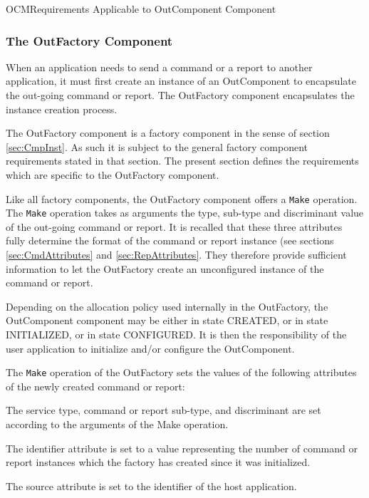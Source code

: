 \documentclass[a4paper,10pt]{article}
\newenvironment{fw_itemize}						%
{\begin{itemize}
  \setlength{\itemsep}{1mm}
  \setlength{\parskip}{0pt}
  \setlength{\parsep}{0pt}}
{\end{itemize}}
\newenvironment{cr_req}[2]
{%
\begin{longtable}{|l|p{9.8cm}|}
\caption{#2} \\
\hline
\rowcolor{light-gray}
\textbf{Req. ID} & \textbf{Requirement Text}\\
\hline\hline
\endfirsthead
\rowcolor{light-gray}
\textbf{Req. ID} & \textbf{Requirement Text}\\
\hline\hline
\endhead
\DTLforeach*[\DTLiseq{\cat}{#1}]{dbReq}{\cat=Category,\type=Type,\id=Id,\reqText=Text}
{\DTLiffirstrow{}{\\\hline}\cat-\id/\type & \textit{\reqText}}\\\hline
}
{\end{longtable}}
\begin{document}
\begin{cr_req}{OCM}{Requirements Applicable to OutComponent Component}
\end{cr_req}

\subsubsection{The OutFactory Component}\label{sec:OutFactory}

When an application needs to send a command or a report to another application, it must first create an instance of an OutComponent to encapsulate the out-going command or report. The OutFactory component encapsulates the instance creation process.

The OutFactory component is a factory component in the sense of section \ref{sec:CmpInst}. As such it is subject to the general factory component requirements stated in that section. The present section defines the requirements which are specific to the OutFactory component.

Like all factory components, the OutFactory component offers a \texttt{Make} operation. The \texttt{Make} operation takes as arguments the type, sub-type and discriminant value of the out-going command or report. It is recalled that these three attributes fully determine the format of the command or report instance (see sections \ref{sec:CmdAttributes} and \ref{sec:RepAttributes}. They therefore provide sufficient information to let the OutFactory create an unconfigured instance of the command or report.

Depending on the allocation policy used internally in the OutFactory, the OutComponent component may be either in state CREATED, or in state INITIALIZED, or in state CONFIGURED. It is then the responsibility of the user application to initialize and/or configure the OutComponent.

The \texttt{Make} operation of the OutFactory sets the values of the following attributes of the newly created command or report:
\begin{fw_itemize}
\item The service type, command or report sub-type, and discriminant are set according to the arguments of the Make operation.
\item The identifier attribute is set to a value representing the number of command or report instances which the factory has created since it was initialized.
\item The source attribute is set to the identifier of the host application.
\end{fw_itemize}
\end{document}
